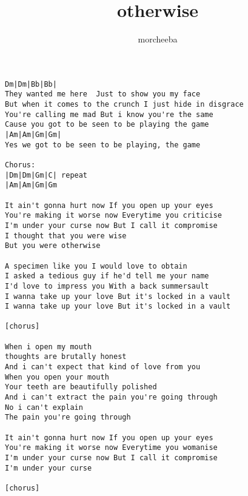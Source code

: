 \author{morcheeba}
\title{otherwise}
\maketitle
\begin{verbatim}
Dm|Dm|Bb|Bb|
They wanted me here  Just to show you my face
But when it comes to the crunch I just hide in disgrace
You're calling me mad But i know you're the same
Cause you got to be seen to be playing the game
|Am|Am|Gm|Gm|
Yes we got to be seen to be playing, the game

Chorus:
|Dm|Dm|Gm|C| repeat
|Am|Am|Gm|Gm

It ain't gonna hurt now If you open up your eyes
You're making it worse now Everytime you criticise
I'm under your curse now But I call it compromise
I thought that you were wise
But you were otherwise

A specimen like you I would love to obtain
I asked a tedious guy if he'd tell me your name
I'd love to impress you With a back summersault
I wanna take up your love But it's locked in a vault
I wanna take up your love But it's locked in a vault

[chorus]

When i open my mouth
thoughts are brutally honest
And i can't expect that kind of love from you
When you open your mouth
Your teeth are beautifully polished
And i can't extract the pain you're going through
No i can't explain
The pain you're going through

It ain't gonna hurt now If you open up your eyes
You're making it worse now Everytime you womanise
I'm under your curse now But I call it compromise
I'm under your curse

[chorus]
\end{verbatim}
